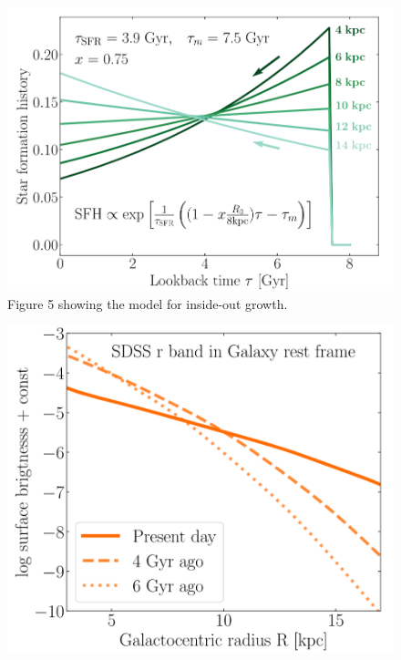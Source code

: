 \documentclass[preprint2]{aastex631}
\begin{document}
\begin{figure}[htb]
    \centering
    \includegraphics[width=\columnwidth]{frankel2019_fig5.png}
    \caption{\citet{Frankel+2019} Figure 5 showing the model for inside-out growth.}
\end{figure}

\begin{figure}[htb]
    \centering
    \includegraphics[width=\columnwidth]{frankel2019_fig9.png}
    \caption{}
\end{figure}
\end{document}
